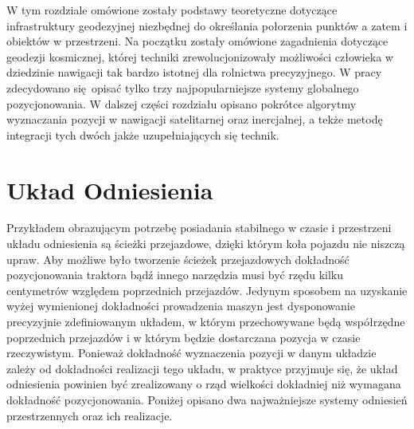 ﻿W tym rozdziale omówione zostały podstawy teoretyczne dotyczące infrastruktury geodezyjnej niezbędnej do określania
połorzenia punktów a zatem i obiektów w przestrzeni. Na początku zostały omówione zagadnienia dotyczące geodezji kosmicznej,
której techniki zrewolucjonizowały możliwości człowieka w dziedzinie nawigacji tak bardzo istotnej dla rolnictwa precyzyjnego.
W pracy zdecydowano się opisać tylko trzy najpopularniejsze systemy globalnego pozycjonowania.
W dalszej części rozdziału opisano pokrótce algorytmy wyznaczania pozycji w nawigacji satelitarnej oraz inercjalnej, a tekże metodę 
integracji tych dwóch jakże uzupełniających się technik. 

\section{Układ Odniesienia}
Przykładem obrazującym potrzebę posiadania stabilnego w czasie i przestrzeni układu odniesienia są ścieżki przejazdowe,
dzięki którym koła pojazdu nie niszczą upraw. Aby możliwe było tworzenie ścieżek przejazdowych dokładność pozycjonowania 
traktora bądź innego narzędzia musi być rzędu kilku centymetrów względem poprzednich przejazdów. Jedynym sposobem 
na uzyskanie wyżej wymienionej dokładności prowadzenia maszyn jest dysponowanie precyzyjnie zdefiniowanym 
układem, w którym przechowywane będą współrzędne poprzednich przejazdów i w którym będzie dostarczana pozycja w 
czasie rzeczywistym. Ponieważ dokładność wyznaczenia pozycji w danym układzie zależy od dokładności realizacji tego układu,
w praktyce przyjmuje się, że układ odniesienia powinien być zrealizowany o rząd wielkości dokładniej niż wymagana dokładność pozycjonowania. \cite[][strona 210]{ggos}
Poniżej opisano dwa najważniejsze systemy odniesień przestrzennych oraz ich realizacje.
